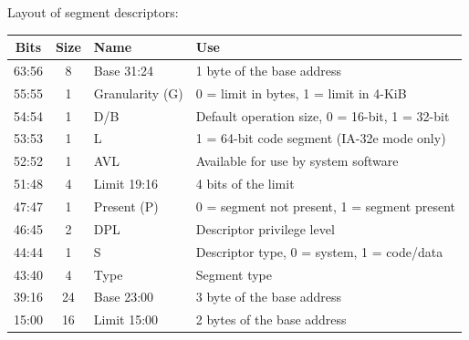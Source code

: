 \documentclass{article}
\newcommand{\layout}[1]{\parbox{\linewidth}{#1}}
\begin{document}
\layout{
  Layout of segment descriptors:
  \begin{table}[H]
    \centering
    \begin{tabular}{|c|c|l|l|}
      \hline \textbf{Bits} & \textbf{Size} & \textbf{Name} & \textbf{Use} \\ \hline
      63:56 & 8 & Base 31:24 & 1 byte of the base address \\
      55:55 & 1 & Granularity (G) & 0 = limit in bytes, 1 = limit in 4-KiB \\
      54:54 & 1 & D/B & Default operation size, 0 = 16-bit, 1 = 32-bit \\
      53:53 & 1 & L & 1 = 64-bit code segment (IA-32e mode only) \\
      52:52 & 1 & AVL & Available for use by system software \\
      51:48 & 4 & Limit 19:16 & 4 bits of the limit \\
      47:47 & 1 & Present (P) & 0 = segment not present, 1 = segment present \\
      46:45 & 2 & DPL & Descriptor privilege level \\
      44:44 & 1 & S & Descriptor type, 0 = system, 1 = code/data \\
      43:40 & 4 & Type & Segment type \\
      39:16 & 24 & Base 23:00 & 3 byte of the base address \\
      15:00 & 16 & Limit 15:00 & 2 bytes of the base address \\ \hline
    \end{tabular}
  \end{table}

  \cite[Chapter~3.4.5]{sdm3}
} \bigskip
\end{document}
